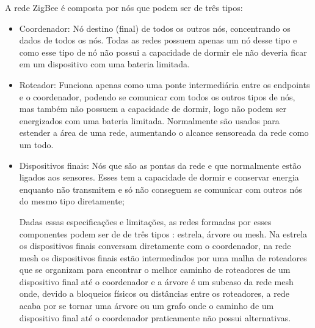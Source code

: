  A rede ZigBee é composta por nós que podem ser de três tipos:
 \begin{itemize}
\item{Coordenador}: Nó destino (final) de todos os outros nós, concentrando os dados de todos os nós. Todas as redes possuem apenas um nó desse tipo e como esse tipo de nó não possui a capacidade de dormir ele não deveria ficar em um dispositivo com uma bateria limitada.
\item{Roteador}: Funciona apenas como uma ponte intermediária entre os endpoints e o coordenador, podendo se comunicar com todos os outros tipos de nós, mas também não possuem a capacidade de dormir, logo não podem ser energizados com uma bateria limitada. Normalmente são usados para estender a área de uma rede, aumentando o alcance sensoreada da rede como um todo.
\item{Dispositivos finais}: Nós que são as pontas da rede e que normalmente estão ligados aos sensores. Esses tem a capacidade de dormir e conservar energia enquanto não transmitem e só não conseguem se comunicar com outros nós do mesmo tipo diretamente;

Dadas essas especificações e limitações, as redes formadas por esses componentes podem ser de de três tipos \cite{xbee_book}: estrela, árvore ou mesh. Na estrela os dispositivos finais conversam diretamente com o coordenador, na rede mesh os dispositivos finais estão intermediados por uma malha de roteadores que se organizam para encontrar o melhor caminho de roteadores de um dispositivo final até o coordenador e a árvore é um subcaso da rede mesh onde, devido a bloqueios físicos ou distâncias entre os roteadores, a rede acaba por se tornar uma árvore ou um grafo onde o caminho de um dispositivo final até o coordenador praticamente não possui alternativas.

\end{itemize}

